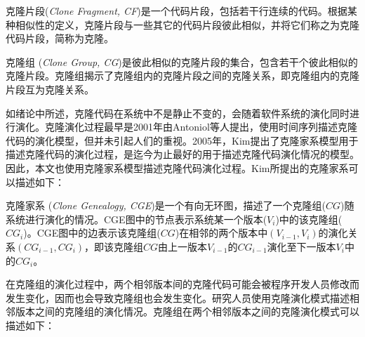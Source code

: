 \begin{definition}[克隆片段]
\label{defn-clonefragment}
克隆片段({\em Clone Fragment, CF\/})是一个代码片段，包括若干行连续的代码。根据某种相似性的定义，克隆片段与一些其它的代码片段彼此相似，并将它们称之为克隆代码片段，简称为克隆。
\end{definition}

\begin{definition}[{克隆组}]
\label {def-clonegroup}
克隆组 ({\em Clone Group, CG})是彼此相似的克隆片段的集合，包含若干个彼此相似的克隆片段。克隆组揭示了克隆组内的克隆片段之间的克隆关系，即克隆组内的克隆片段互为克隆关系。
\end {definition}


如绪论中所述，克隆代码在系统中不是静止不变的，会随着软件系统的演化同时进行演化。克隆演化过程最早是2001年由Antoniol等人提出，使用时间序列描述克隆代码的演化模型\cite{antoniol2001modeling}，但并未引起人们的重视。2005年，Kim提出了克隆家系模型用于描述克隆代码的演化过程，是迄今为止最好的用于描述克隆代码演化情况的模型\cite{kim2005empirical}。因此，本文也使用克隆家系模型描述克隆代码演化过程。Kim所提出的克隆家系可以描述如下：\\

\begin{definition}[{克隆家系}]
\label{def-clonegenealogy}
克隆家系 ({\em Clone Genealogy, CGE\/})是一个有向无环图，描述了一个克隆组($CG$)随系统进行演化的情况。CGE图中的节点表示系统某一个版本($V_i$)中的该克隆组($CG_i$)。CGE图中的边表示该克隆组($CG$)在相邻的两个版本中$(V_{i-1},V_i )$的演化关系$(CG_{i-1},CG_{i})$，即该克隆组$CG$由上一版本$V_{i-1}$的$CG_{i-1}$演化至下一版本$V_{i}$中的$CG_{i}$。
\end{definition} 

在克隆组的演化过程中，两个相邻版本间的克隆代码可能会被程序开发人员修改而发生变化，因而也会导致克隆组也会发生变化。研究人员使用克隆演化模式描述相邻版本之间的克隆组的演化情况。克隆组在两个相邻版本之间的克隆演化模式可以描述如下：\\

